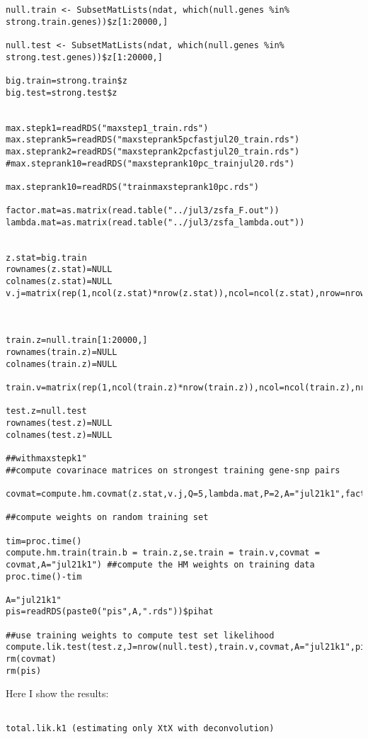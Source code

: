 \documentclass[10pt]{article}
\begin{document}
\begin{itemize}
\begin{verbatim}
null.train <- SubsetMatLists(ndat, which(null.genes %in% strong.train.genes))$z[1:20000,]

null.test <- SubsetMatLists(ndat, which(null.genes %in% strong.test.genes))$z[1:20000,]

big.train=strong.train$z
big.test=strong.test$z


max.stepk1=readRDS("maxstep1_train.rds")
max.steprank5=readRDS("maxsteprank5pcfastjul20_train.rds")
max.steprank2=readRDS("maxsteprank2pcfastjul20_train.rds")
#max.steprank10=readRDS("maxsteprank10pc_trainjul20.rds")

max.steprank10=readRDS("trainmaxsteprank10pc.rds")

factor.mat=as.matrix(read.table("../jul3/zsfa_F.out"))
lambda.mat=as.matrix(read.table("../jul3/zsfa_lambda.out"))


z.stat=big.train
rownames(z.stat)=NULL
colnames(z.stat)=NULL
v.j=matrix(rep(1,ncol(z.stat)*nrow(z.stat)),ncol=ncol(z.stat),nrow=nrow(z.stat))



train.z=null.train[1:20000,]
rownames(train.z)=NULL
colnames(train.z)=NULL

train.v=matrix(rep(1,ncol(train.z)*nrow(train.z)),ncol=ncol(train.z),nrow=nrow(train.z))

test.z=null.test
rownames(test.z)=NULL
colnames(test.z)=NULL

##withmaxstepk1"
##compute covarinace matrices on strongest training gene-snp pairs

covmat=compute.hm.covmat(z.stat,v.j,Q=5,lambda.mat,P=2,A="jul21k1",factor.mat,max.step=max.stepk1)

##compute weights on random training set

tim=proc.time()
compute.hm.train(train.b = train.z,se.train = train.v,covmat = covmat,A="jul21k1") ##compute the HM weights on training data
proc.time()-tim

A="jul21k1"
pis=readRDS(paste0("pis",A,".rds"))$pihat

##use training weights to compute test set likelihood
compute.lik.test(test.z,J=nrow(null.test),train.v,covmat,A="jul21k1",pis) 
rm(covmat)
rm(pis)
\end{verbatim}

Here I show the results:



\begin{verbatim}

total.lik.k1 (estimating only XtX with deconvolution)	
	

\end{verbatim}
\end{itemize}
\end{document}

